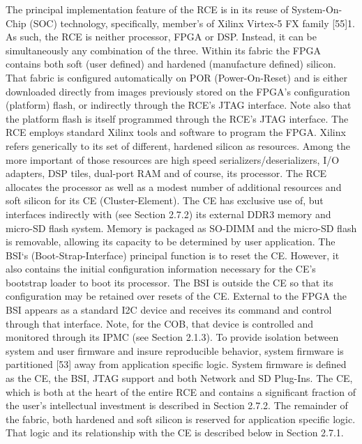 The principal implementation feature of the RCE is in its reuse of System-On-Chip (SOC) technology, specifically, member's of Xilinx Virtex-5 FX family [55]1. As such, the RCE is neither processor, FPGA or DSP. Instead, it can be simultaneously any combination of the three. Within its fabric the FPGA contains both soft (user defined) and hardened (manufacture defined) silicon. That fabric is configured automatically on POR (Power-On-Reset) and is either downloaded directly from images previously stored on the FPGA's configuration (platform) flash, or indirectly through the RCE's JTAG interface. Note also that the platform flash is itself programmed through the RCE's JTAG interface. The RCE employs standard Xilinx tools and software to program the FPGA.
Xilinx refers generically to its set of different, hardened silicon as resources. Among the more important of those resources are high speed serializers/deserializers, I/O adapters, DSP tiles, dual-port RAM and of course, its processor. The RCE allocates the processor as well as a modest number of additional resources and soft silicon for its CE (Cluster-Element). The CE has exclusive use of, but interfaces indirectly with (see Section 2.7.2) its external DDR3 memory and micro-SD flash system. Memory is packaged as SO-DIMM and the micro-SD flash is removable, allowing its capacity to be determined by user application.
The BSI‘s (Boot-Strap-Interface) principal function is to reset the CE. However, it also contains the initial configuration information necessary for the CE's bootstrap loader to boot its processor. The BSI is outside the CE so that its configuration may be retained over resets of the CE. External to the FPGA the BSI appears as a standard I2C device and receives its command and control through that interface. Note, for the COB, that device is controlled and monitored through its IPMC (see Section 2.1.3).
To provide isolation between system and user firmware and insure reproducible behavior, system firmware is partitioned [53] away from application specific logic. System firmware is defined as the CE, the BSI, JTAG support and both Network and SD Plug-Ins.
The CE, which is both at the heart of the entire RCE and contains a significant fraction of the user's intellectual investment is described in Section 2.7.2. The remainder of the fabric, both hardened and soft silicon is reserved for application specific logic. That logic and its relationship with the CE is described below in Section 2.7.1.

